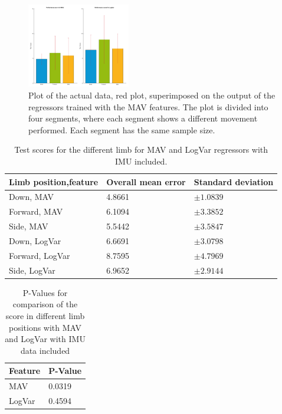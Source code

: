 	\begin{figure}[!thpb]
		\centering
		\includegraphics[width=0.4\textwidth]{figures/GotItTimeIMU}  %
		\caption{Plot of the actual data, red plot, superimposed on the output of the regressors trained with the MAV features. The plot is divided into four segments, where each segment shows a different movement performed. Each segment has the same sample size.}
		\label{fig:GotItTimeIMU}  %
	\end{figure}
	
	\begin{table}[!thpb]
		\begin{center}
			\begin{tabular}{l l l}
				\hline
				\textbf{Limb position,feature} & \textbf{Overall mean error} & \textbf{Standard deviation}\\
				\hline
				Down, MAV & 4.8661 & $\pm 1.0839$ \\
				Forward, MAV & 6.1094 & $\pm 3.3852$ \\
				Side, MAV & 5.5442 & $\pm 3.5847$ \\
				Down, LogVar & 6.6691 & $\pm 3.0798$ \\
				Forward, LogVar & 8.7595 & $\pm 4.7969$ \\
				Side, LogVar & 6.9652 & $\pm 2.9144$ \\
				\hline
			\end{tabular}
			\caption{Test scores for the different limb for MAV and LogVar regressors with IMU included.}
		\end{center}
	\end{table}
	
	\begin{table}[!thpb]	
		\begin{center}
			\begin{tabular}{l l}
				\hline
				\textbf{Feature} & \textbf{P-Value}\\
				\hline
				MAV & 0.0319 \\
				LogVar & 0.4594 \\
				\hline
			\end{tabular}
			\caption{P-Values for comparison of the score in different limb positions with MAV and LogVar with IMU data included}
		\end{center}
	\end{table}
	
